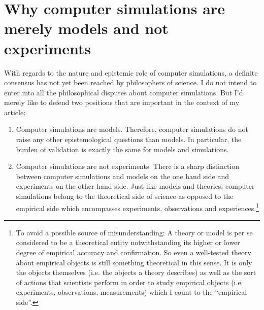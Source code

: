 \documentclass[onecollarge]{STJour}
\numberwithin{equation}{section}
\begin{document}
\section{Why computer simulations are merely models and not experiments} 

With regards to the nature and epistemic role of computer simulations,
a definite consensus has not yet been reached by philosophers of
science. I do not intend to enter into all the philosophical disputes
about computer simulations. But I'd merely like to defend two positions
that are important in the context of my article:

\begin{enumerate}
  \item Computer simulations are models. Therefore, computer simulations
  do not raise any other epistemological questions than
  models. In particular, the burden of validation is exactly the
  same for models and simulations.

  \item Computer simulations are not experiments. There is a sharp
  distinction between computer simulations and models on the one hand
  side and experiments on the other hand side. Just like models and
  theories, computer simulations belong to the theoretical side of
  science as opposed to the empirical side which encompasses experiments,
  observations and experiences.\footnote{To avoid a possible source of
  misunderstanding: A theory or model is per se considered to be a
  theoretical entity notwithstanding its higher or lower degree of
  empirical accuracy and confirmation. So even a well-tested theory about
  empirical objects is still something theoretical in this sense. It is
  only the objects themselves (i.e. the objects a theory describes) as
  well as the sort of actions that scientists perform in order to study
  empirical objects (i.e. experiments, observations, measurements)
  which I count to the ``empirical side''.}

\end{enumerate}
\end{document}
